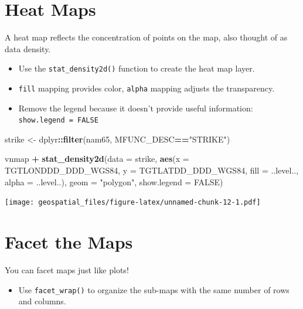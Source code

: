 \documentclass[oneside]{memoir}
\newenvironment{Shaded}{\begin{snugshade}}{\end{snugshade}}
\newcommand{\KeywordTok}[1]{\textcolor[rgb]{0.13,0.29,0.53}{\textbf{#1}}}
\newcommand{\DataTypeTok}[1]{\textcolor[rgb]{0.13,0.29,0.53}{#1}}
\newcommand{\StringTok}[1]{\textcolor[rgb]{0.31,0.60,0.02}{#1}}
\newcommand{\OtherTok}[1]{\textcolor[rgb]{0.56,0.35,0.01}{#1}}
\newcommand{\OperatorTok}[1]{\textcolor[rgb]{0.81,0.36,0.00}{\textbf{#1}}}
\newcommand{\NormalTok}[1]{#1}
\providecommand{\tightlist}{%
  \setlength{\itemsep}{0pt}\setlength{\parskip}{0pt}}
\theoremstyle{definition}
\theoremstyle{definition}
\theoremstyle{definition}
\theoremstyle{remark}
\begin{document}
\section{Heat Maps}\label{heat-maps}

A heat map reflects the concentration of points on the map, also thought
of as data density.

\begin{itemize}
\item
  Use the \texttt{stat\_density2d()} function to create the heat map
  layer.
\item
  \texttt{fill} mapping provides color, \texttt{alpha} mapping adjusts
  the transparency.
\item
  Remove the legend because it doesn't provide useful information:
  \texttt{show.legend\ =\ FALSE}
\end{itemize}

\begin{Shaded}
\begin{Highlighting}[]
\NormalTok{strike <-}\StringTok{ }\NormalTok{dplyr}\OperatorTok{::}\KeywordTok{filter}\NormalTok{(nam65, MFUNC_DESC}\OperatorTok{==}\StringTok{"STRIKE"}\NormalTok{)}

\NormalTok{vnmap }\OperatorTok{+}\StringTok{ }
\StringTok{  }\KeywordTok{stat_density2d}\NormalTok{(}\DataTypeTok{data =}\NormalTok{ strike, }\KeywordTok{aes}\NormalTok{(}\DataTypeTok{x =}\NormalTok{ TGTLONDDD_DDD_WGS84, }\DataTypeTok{y =}\NormalTok{ TGTLATDD_DDD_WGS84, }
                                    \DataTypeTok{fill =}\NormalTok{ ..level.., }\DataTypeTok{alpha =}\NormalTok{ ..level..), }
                 \DataTypeTok{geom =} \StringTok{"polygon"}\NormalTok{, }\DataTypeTok{show.legend =} \OtherTok{FALSE}\NormalTok{)}
\end{Highlighting}
\end{Shaded}

\texttt{[image: geospatial\_files/figure-latex/unnamed-chunk-12-1.pdf]}

\section{Facet the Maps}\label{facet-the-maps}

You can facet maps just like plots!

\begin{itemize}
\tightlist
\item
  Use \texttt{facet\_wrap()} to organize the sub-maps with the same
  number of rows and columns.
\end{itemize}
\end{document}
